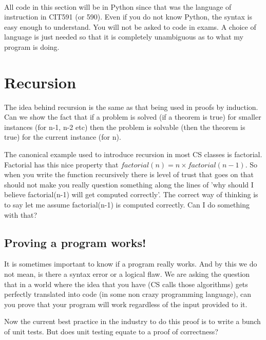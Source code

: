 \documentclass[12pt]{article}
\begin{document}
\begin{center}
\\
\vspace{1cm}
\end{center}

\vspace{0.5cm}\noindent

All code in this section will be in Python since that was the language of instruction in CIT591 (or 590). Even if you do not know Python, the syntax is easy enough to understand. You will not be asked to code in exams. A choice of language is just needed so that it is completely unambiguous as to what my program is doing.

\section*{Recursion}
The idea behind recursion is the same as that being used in proofs by induction. Can we show the fact that if a problem is solved (if a theorem is true) for smaller instances (for n-1, n-2 etc) then the problem is solvable (then the theorem is true) for the current instance (for n).

The canonical example used to introduce recursion in most CS classes is factorial. Factorial has this nice property that $factorial(n) = n \times factorial(n-1)$. So when you write the function recursively there is level of trust that goes on that should not make you really question something along the lines of 'why should I believe factorial(n-1) will get computed correctly'. The correct way of thinking is to say let me assume factorial(n-1) is computed correctly. Can I do something with that?

\subsection*{Proving a program works!}

It is sometimes important to know if a program really works. And by this we do not mean, is there a syntax error or a logical flaw. We are asking the question that in a world where the idea that you have (CS calls those algorithms) gets perfectly translated into code (in some non crazy programming language), can you prove that your program will work regardless of the input provided to it.

Now the current best practice in the industry to do this proof is to write a bunch of unit tests. But does unit testing equate to a proof of correctness?
\end{document}

